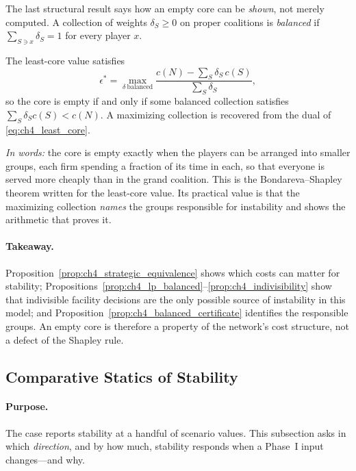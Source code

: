 The last structural result says how an empty core can be \emph{shown}, not merely computed. A collection of weights $\delta_S\geq0$ on proper coalitions is \emph{balanced} if $\sum_{S\ni x}\delta_S=1$ for every player $x$.

\begin{proposition}
\label{prop:ch4_balanced_certificate}
The least-core value satisfies
\begin{equation}
\label{eq:ch4_certificate}
\epsilon^*=\max_{\delta\ \text{balanced}}
\frac{c(N)-\sum_{S}\delta_S\,c(S)}{\sum_{S}\delta_S},
\end{equation}
so the core is empty if and only if some balanced collection satisfies $\sum_S\delta_Sc(S)<c(N)$. A maximizing collection is recovered from the dual of \eqref{eq:ch4_least_core}.
\end{proposition}

\emph{In words:} the core is empty exactly when the players can be arranged into smaller groups, each firm spending a fraction of its time in each, so that everyone is served more cheaply than in the grand coalition. This is the Bondareva--Shapley theorem \cite{Bondareva1963,Shapley1967,PelegSudholter2007} written for the least-core value. Its practical value is that the maximizing collection \emph{names} the groups responsible for instability and shows the arithmetic that proves it.

\paragraph{Takeaway.} Proposition~\ref{prop:ch4_strategic_equivalence} shows which costs can matter for stability; Propositions~\ref{prop:ch4_lp_balanced}--\ref{prop:ch4_indivisibility} show that indivisible facility decisions are the only possible source of instability in this model; and Proposition~\ref{prop:ch4_balanced_certificate} identifies the responsible groups. An empty core is therefore a property of the network's cost structure, not a defect of the Shapley rule.

\subsection{Comparative Statics of Stability}
\label{sec:ch4_statics_theory}

\paragraph{Purpose.} The case reports stability at a handful of scenario values. This subsection asks in which \emph{direction}, and by how much, stability responds when a Phase~I input changes---and why.


